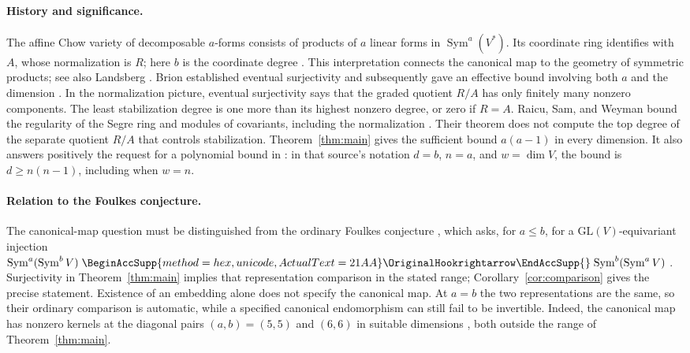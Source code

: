 \documentclass[11pt]{article}
\renewcommand{\hookrightarrow}{\mathrel{
  \BeginAccSupp{method=hex,unicode,ActualText=21AA}
  \OriginalHookrightarrow\EndAccSupp{}}}
\theoremstyle{remark}
\DeclareMathOperator{\Sym}{Sym}
\begin{document}
\paragraph{History and significance.}
The affine Chow variety of decomposable $a$-forms consists of products of
$a$ linear forms in $\Sym^a(V^*)$. Its coordinate ring identifies with
$A$, whose normalization is $R$; here $b$ is the coordinate degree
\cite[Section~2, Theorem~2.3]{RSW}. This interpretation connects the
canonical map to the geometry of symmetric products; see also
Landsberg \cite[Section~7.6, Propositions~7.11--7.12]{Landsberg}.
Brion established eventual surjectivity \cite{Brion1993} and subsequently
gave an effective bound involving both $a$ and the dimension
\cite[Theorem~3.3]{Brion}. In the normalization picture, eventual
surjectivity says that the graded quotient $R/A$ has only finitely many
nonzero components. The least stabilization degree is one more than its
highest nonzero degree, or zero if $R=A$. Raicu, Sam, and Weyman bound the
regularity of the Segre ring and modules of covariants, including the
normalization \cite[Theorem~3.9]{RSW}. Their theorem does not compute the
top degree of the separate quotient $R/A$ that controls stabilization.
Theorem~\ref{thm:main} gives the sufficient bound $a(a-1)$ in every
dimension. It also answers positively the request for a polynomial bound in
\cite[Problem~7.19]{Landsberg}: in that source's notation $d=b$, $n=a$,
and $w=\dim V$, the bound is $d\ge n(n-1)$, including when $w=n$.

\paragraph{Relation to the Foulkes conjecture.}
The canonical-map question must be distinguished from the ordinary
Foulkes conjecture \cite{Foulkes1950}, which asks, for $a\le b$, for a
$\mathrm{GL}(V)$-equivariant injection
$\Sym^a(\Sym^b V)\hookrightarrow\Sym^b(\Sym^a V)$
\cite[Conjecture~2.10]{RSW}.
Surjectivity in Theorem~\ref{thm:main} implies that representation
comparison in the stated range; Corollary~\ref{cor:comparison} gives the
precise statement. Existence of an embedding alone does not specify the
canonical map. At $a=b$ the two representations are the same, so their
ordinary comparison is automatic, while a specified canonical endomorphism
can still fail to be invertible. Indeed, the canonical map has nonzero
kernels at the diagonal pairs $(a,b)=(5,5)$ and $(6,6)$ in suitable
dimensions
\cite[arXiv version, Theorem~6(b),(c) and Remark~7]{CIM}, both outside the
range of Theorem~\ref{thm:main}.
\end{document}
